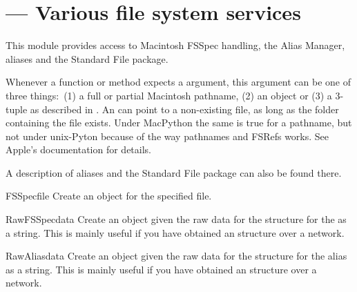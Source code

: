 \section{ ---
         Various file system services}



This module provides access to Macintosh FSSpec handling, the Alias
Manager,  aliases and the Standard File package.

Whenever a function or method expects a  argument, this
argument can be one of three things:\ (1) a full or partial Macintosh
pathname, (2) an  object or (3) a 3-tuple
 as described in
. An  can point to
a non-existing file, as long as the folder containing the file exists.
Under MacPython the same is true for a pathname, but not under unix-Pyton
because of the way pathnames and FSRefs works. See Apple's documentation
for details.

A description of aliases and the
Standard File package can also be found there.

\begin{funcdesc}{FSSpec}{file}
Create an  object for the specified file.
\end{funcdesc}

\begin{funcdesc}{RawFSSpec}{data}
Create an  object given the raw data for the \C{}
structure for the  as a string.  This is mainly useful
if you have obtained an  structure over a network.
\end{funcdesc}

\begin{funcdesc}{RawAlias}{data}
Create an  object given the raw data for the \C{}
structure for the alias as a string.  This is mainly useful if you
have obtained an  structure over a network.
\end{funcdesc}

